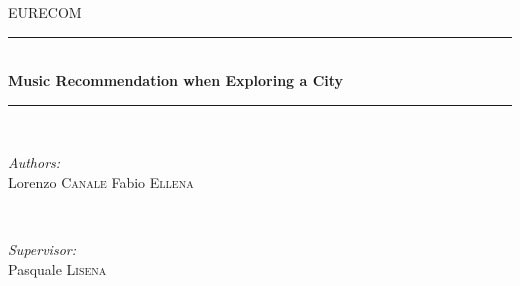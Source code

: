 \documentclass[paper=a4, fontsize=11pt]{scrartcl}
\begin{document}
\begin{titlepage}

\newcommand{\HRule}{\rule{\linewidth}{0.5mm}} %

\center %
 

\textsc{\LARGE EURECOM}\\[1.5cm] %


\HRule \\[0.4cm]
{ \huge \bfseries Music Recommendation when Exploring a City}\\[0.4cm] %
\HRule \\[1.5cm]
 

\begin{minipage}{0.4\textwidth}
\begin{flushleft} \large
\emph{Authors:}\\
Lorenzo \textsc{Canale} %
\newline
Fabio \textsc{Ellena} %
\end{flushleft}
\end{minipage}
~
\begin{minipage}{0.4\textwidth}
\begin{flushright} \large
\emph{Supervisor:} \\
Pasquale \textsc{Lisena} %
\end{flushright}
\end{minipage}\\[2cm]


\end{titlepage}
\end{document}
